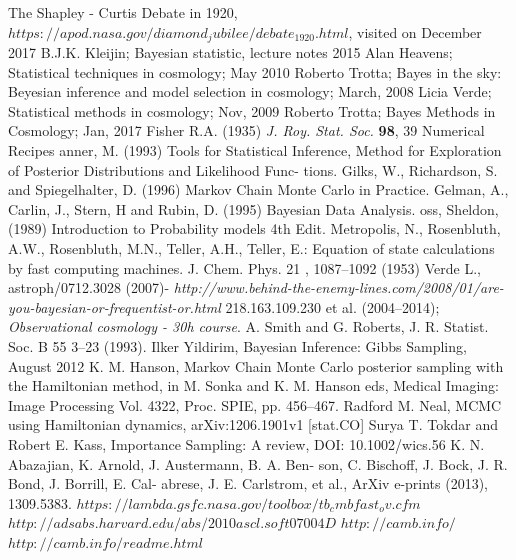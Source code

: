 \documentclass[onecolumn,           %
               showpacs,            %
               preprintnumbers,     %
               aps,                 %
               letterpaper,             %
               superscriptaddress,      %
               nofootinbib,         %
               tightenlines,        %
               floats,floatfix      %
               ,usenatbib,
               ]{revtex4-1}
\begin{document}
\begin{thebibliography}{9}
 The Shapley - Curtis Debate in 1920, $https://apod.nasa.gov/diamond_jubilee/debate_1920.html$, visited on December 2017
B.J.K. Kleijin; Bayesian statistic, lecture notes 2015
 Alan Heavens; Statistical techniques in cosmology; May 2010
 Roberto Trotta; Bayes in the sky: Beyesian inference and model selection in cosmology; March, 2008
 Licia Verde; Statistical methods in cosmology; Nov, 2009
Roberto Trotta; Bayes Methods in Cosmology; Jan, 2017
Fisher R.A. (1935) \textit{J. Roy. Stat. Soc.} \textbf{98}, 39
Numerical Recipes
anner, M. (1993)
Tools for Statistical Inference, Method for
Exploration of Posterior Distributions and Likelihood Func-
tions.
Gilks, W., Richardson, S. and Spiegelhalter, D. (1996)
Markov Chain
Monte Carlo in Practice.
Gelman, A., Carlin, J., Stern, H and Rubin, D. (1995)
Bayesian Data
Analysis.
oss, Sheldon, (1989)
Introduction to Probability models 4th
Edit.
 Metropolis, N., Rosenbluth, A.W., Rosenbluth, M.N., Teller, A.H., Teller, E.: Equation of state
calculations by fast computing machines. J. Chem. Phys.
21
, 1087–1092 (1953)
 Verde L., astroph/0712.3028 (2007)-
\textit{http://www.behind-the-enemy-lines.com/2008/01/are-you-bayesian-or-frequentist-or.html}
218.163.109.230 et al. (2004–2014); \textit{Observational cosmology -
30h course}.
 A. Smith and G. Roberts, J. R. Statist. Soc. B
55
3–23 (1993).
 Ilker Yildirim, Bayesian Inference: Gibbs Sampling, August 2012
K. M. Hanson, Markov Chain Monte Carlo posterior sampling with the Hamiltonian method, in M. Sonka and K. M. Hanson eds, Medical Imaging: Image Processing
Vol. 4322, Proc. SPIE, pp. 456–467.
 Radford M. Neal, MCMC using Hamiltonian dynamics, arXiv:1206.1901v1 [stat.CO]
 Surya T. Tokdar and Robert E. Kass, Importance Sampling: A review, DOI: 10.1002/wics.56
%
%
%
%
 K. N. Abazajian, K. Arnold, J. Austermann, B. A. Ben-
son, C. Bischoff, J. Bock, J. R. Bond, J. Borrill, E. Cal-
abrese,  J.  E.  Carlstrom,  et  al.,  ArXiv  e-prints  (2013),
1309.5383.
$https://lambda.gsfc.nasa.gov/toolbox/tb_cmbfast_ov.cfm$
$http://adsabs.harvard.edu/abs/2010ascl.soft07004D$
$http://camb.info/$
$http://camb.info/readme.html$

\end{thebibliography}
\end{document}
